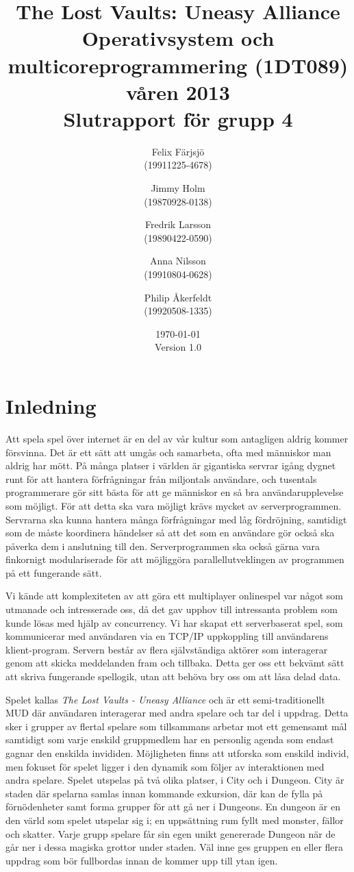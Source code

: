\documentclass[a4paper]{article}
\title{The Lost Vaults: Uneasy Alliance\\\small{Operativsystem och multicoreprogrammering (1DT089) våren 2013}\\\small{Slutrapport för grupp 4}}
\author{Felix Färjsjö\\(19911225-4678) \and Jimmy Holm\\(19870928-0138) \and Fredrik Larsson\\(19890422-0590) \and Anna Nilsson\\(19910804-0628) \and Philip Åkerfeldt\\(19920508-1335)}
\date{\today\\Version 1.0}
\begin{document}
\maketitle
\thispagestyle{empty}
\newpage
\setcounter{page}{1}
\tableofcontents
\listoffigures
\newpage
\setcounter{page}{1}
\section{Inledning}
Att spela spel över internet är en del av vår kultur som antagligen aldrig kommer försvinna. Det är ett sätt att umgås och samarbeta, ofta med människor man aldrig har mött. 
På många platser i världen är gigantiska servrar igång dygnet runt för att hantera förfrågningar från miljontals användare, och tusentals programmerare gör sitt bästa för 
att ge människor en så bra användarupplevelse som möjligt. 
För att detta ska vara möjligt krävs mycket av serverprogrammen. 
Servrarna ska kunna hantera många förfrågningar med låg fördröjning, samtidigt som de måste koordinera händelser så att det som en användare gör också ska påverka dem i anslutning till den. 
Serverprogrammen ska också gärna vara finkornigt modulariserade för att möjliggöra parallellutveklingen av programmen på ett fungerande sätt.  
 
Vi kände att komplexiteten av att göra ett multiplayer onlinespel var något som utmanade och intresserade oss, då det gav upphov till intressanta problem som kunde lösas med hjälp av concurrency. 
Vi har skapat ett serverbaserat spel, som kommunicerar med användaren via en TCP/IP uppkoppling till användarens klient-program. Servern består av flera självständiga aktörer som interagerar
genom att skicka meddelanden fram och tillbaka. Detta ger oss ett bekvämt sätt att skriva fungerande spellogik, utan att behöva bry oss om att låsa delad data.

Spelet kallas \textit{The Lost Vaults - Uneasy Alliance} och är ett semi-traditionellt MUD där användaren interagerar med andra spelare och tar del i uppdrag. 
Detta sker i grupper av flertal spelare som tillsammans arbetar mot ett gemensamt mål samtidigt som varje enskild gruppmedlem har en personlig agenda som endast 
gagnar den enskilda invididen. Möjligheten finns att utforska som enskild individ, men fokuset för spelet ligger i den dynamik som följer av 
interaktionen med andra spelare. Spelet utspelas på två olika platser, i City och i Dungeon. City är staden där spelarna samlas innan kommande exkursion, där kan de fylla på förnödenheter samt forma grupper för att gå ner i Dungeons. En dungeon är en den värld som spelet utspelar sig i; en uppsättning rum fyllt med monster, fällor och skatter. 
Varje grupp spelare får sin egen unikt genererade Dungeon när de går ner i dessa magiska grottor under staden. Väl inne ges gruppen en eller flera uppdrag som bör fullbordas innan de kommer upp till ytan igen.
\end{document}
